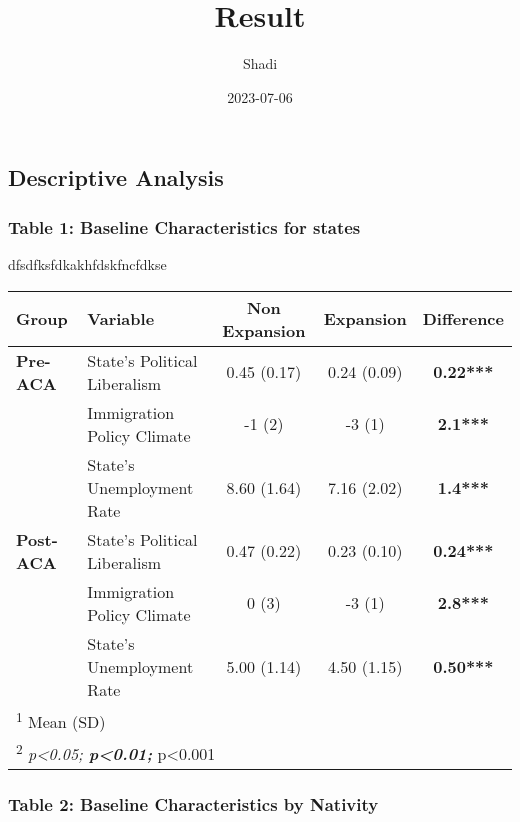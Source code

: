 \documentclass[
]{article}
\title{Result}
\author{Shadi}
\date{2023-07-06}
\let\origtable\table
\let\endorigtable\endtable
\renewenvironment{table}[1][ht]{
      \expandafter\origtable\expandafter[H]
    }{
      \endorigtable
    }
\begin{document}
\maketitle

\hypertarget{descriptive-analysis}{%
\subsection{Descriptive Analysis}\label{descriptive-analysis}}

\hypertarget{table-1-baseline-characteristics-for-states}{%
\subsubsection{Table 1: Baseline Characteristics for
states}\label{table-1-baseline-characteristics-for-states}}

dfsdfksfdkakhfdskfncfdkse

\begin{table}[H]

\caption{\label{tab:tab1}Baseline Comparison of States}
\centering
\begin{tabular}[t]{>{}llccc}
\toprule
\textbf{Group} & \textbf{Variable} & \textbf{Non Expansion} & \textbf{Expansion} & \textbf{Difference}\\
\midrule
\textbf{Pre-ACA} & State's Political Liberalism & 0.45 (0.17) & 0.24 (0.09) & \textbf{0.22***}\\
\textbf{} & Immigration Policy Climate & -1 (2) & -3 (1) & \textbf{2.1***}\\
\textbf{} & State's Unemployment Rate & 8.60 (1.64) & 7.16 (2.02) & \textbf{1.4***}\\
\midrule
\textbf{Post-ACA} & State's Political Liberalism & 0.47 (0.22) & 0.23 (0.10) & \textbf{0.24***}\\
\textbf{} & Immigration Policy Climate & 0 (3) & -3 (1) & \textbf{2.8***}\\
\textbf{} & State's Unemployment Rate & 5.00 (1.14) & 4.50 (1.15) & \textbf{0.50***}\\
\bottomrule
\multicolumn{5}{l}{\rule{0pt}{1em}\textsuperscript{1} Mean (SD)}\\
\multicolumn{5}{l}{\rule{0pt}{1em}\textsuperscript{2} \textit{p<0.05; \textbf{p<0.01; }}p<0.001}\\
\end{tabular}
\end{table}

\hypertarget{table-2-baseline-characteristics-by-nativity}{%
\subsubsection{Table 2: Baseline Characteristics by
Nativity}\label{table-2-baseline-characteristics-by-nativity}}
\end{document}
